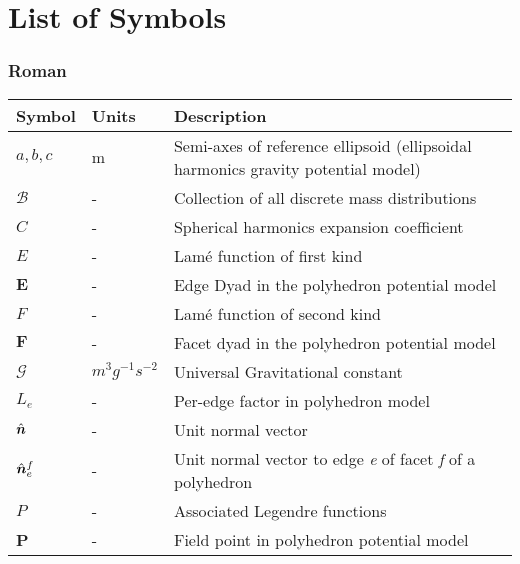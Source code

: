 \chapter*{List of Symbols}
\label{los}

\subsection*{Roman}
\begin{longtable}[l]{p{100pt} p{70pt} p{150pt}}
    \textbf{Symbol} & \textbf{Units} & \textbf{Description}                                 \\
    \hline
    $a, b, c$        & m                & Semi-axes of reference ellipsoid
                                          (ellipsoidal harmonics gravity potential model)   \\
    $\mathcal{B}$    & -                & Collection of all discrete mass distributions     \\
    $C$              & -                & Spherical harmonics expansion coefficient         \\
    $E$              & -                & Lam\'e function of first kind                     \\
    $\bm{E}$         & -                & Edge Dyad in the polyhedron potential model       \\
    $F$              & -                & Lam\'e function of second kind                    \\
    $\bm{F}$         & -                & Facet dyad in the polyhedron potential model      \\
    $\mathcal{G}$    & $m^3 g^{-1} s^{-2}$ & Universal Gravitational constant               \\
    $L_e$            & -                & Per-edge factor in polyhedron model               \\
    $\hat{\bm{n}}$      & -                & Unit normal vector                                \\
    $\hat{\bm{n}}_e^f$  & -                & Unit normal vector to edge \textit{e}
                                          of facet \textit{f} of a polyhedron               \\
    $P$              & -                & Associated Legendre functions                     \\
    \textbf{P}       & -                & Field point in polyhedron potential model         \\

\end{longtable}
